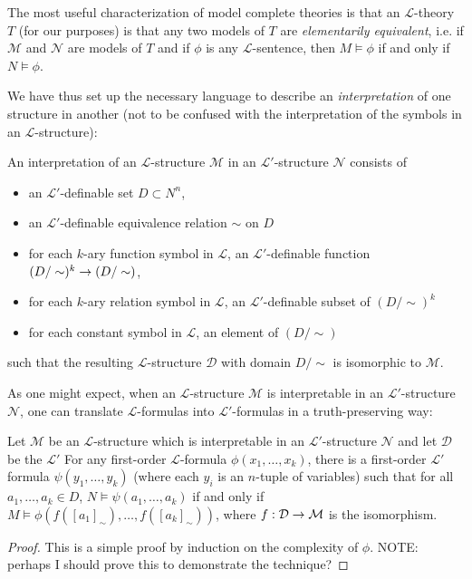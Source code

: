 The most useful characterization of model complete theories is that an $\mathcal{L}$-theory $T$ (for our purposes) is that any two models of $T$ are \emph{elementarily equivalent}, i.e. if $\mathcal{M}$ and $\mathcal{N}$ are models of $T$ and if $\phi$ is any $\mathcal{L}$-sentence, then $M\models \phi$ if and only if $N\models \phi$.

We have thus set up the necessary language to describe an \emph{interpretation} of one structure in another (not to be confused with the interpretation of the symbols in an $\mathcal{L}$-structure):

\begin{definition}
An interpretation of an $\mathcal{L}$-structure $\mathcal{M}$ in an $\mathcal{L}'$-structure $\mathcal{N}$ consists of
\begin{itemize}
\item an $\mathcal{L}'$-definable set $D\subset N^n$,
\item an $\mathcal{L}'$-definable equivalence relation $\sim$ on $D$
\item for each $k$-ary function symbol in $\mathcal{L}$, an $\mathcal{L}'$-definable function $(D/\sim)^k\rightarrow (D/\sim)$,
\item for each $k$-ary relation symbol in $\mathcal{L}$, an $\mathcal{L}'$-definable subset of $(D/\sim)^k$
\item for each constant symbol in $\mathcal{L}$, an element of $(D/\sim)$
\end{itemize}
such that the resulting $\mathcal{L}$-structure $\mathcal{D}$ with domain $D/\sim$ is isomorphic to $\mathcal{M}$.
\end{definition}

As one might expect, when an $\mathcal{L}$-structure $\mathcal{M}$ is interpretable in an $\mathcal{L}'$-structure $\mathcal{N}$, one can translate $\mathcal{L}$-formulas into $\mathcal{L}'$-formulas in a truth-preserving way:

\begin{proposition}
Let $\mathcal{M}$ be an $\mathcal{L}$-structure which is interpretable in an $\mathcal{L}'$-structure $\mathcal{N}$ and let $\mathcal{D}$ be the $\mathcal{L}'$ For any first-order $\mathcal{L}$-formula $\phi(x_1,\dots, x_k)$, there is a first-order $\mathcal{L}'$ formula $\psi(y_1,\dots, y_k)$ (where each $y_i$ is an $n$-tuple of variables) such that for all $a_1,\dots, a_k\in D$, $N\models \psi(a_1,\dots, a_k)$ if and only if $M\models \phi(f([a_1]_{\sim}), \dots, f([a_k]_{\sim}))$, where $f:\mathcal{D}\rightarrow \mathcal{M}$ is the isomorphism.
\end{proposition}
\begin{proof}
This is a simple proof by induction on the complexity of $\phi$. NOTE: perhaps I should prove this to demonstrate the technique?
\end{proof}

